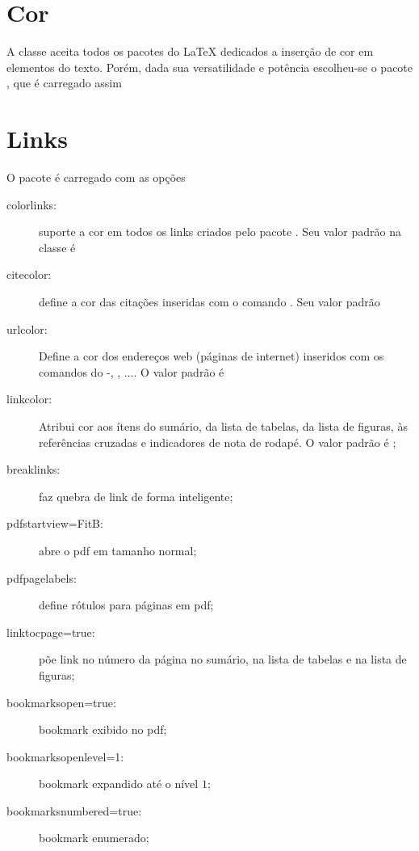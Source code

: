 \section{Cor}

A classe \estilo{} aceita todos os pacotes do \LaTeX{} dedicados a
inserção de cor em elementos do texto. Porém, dada sua versatilidade
e potência escolheu-se o pacote , que é carregado assim
\begin{center}
\end{center}

\section{Links} \label{links}
O pacote  é carregado com as opções
\begin{description}
  \item[colorlinks:] suporte a cor em todos os
     links criados pelo pacote . Seu valor padrão
     na classe \estilo{} é \hfill {}
  \item[citecolor:] define a cor das citações inseridas com o
     comando . Seu valor padrão
\hfill {}
  \item[urlcolor:] Define a cor dos endereços web (páginas de internet)
     inseridos com os comandos do  -,
     , $\ldots$. O valor padrão é \hfill {}
  \item[linkcolor:] Atribui cor aos ítens do sumário, da lista de
     tabelas, da lista de figuras, às referências cruzadas e indicadores
     de nota de rodapé. O valor padrão é \hfill  {};
  \item[breaklinks:] faz quebra de link de forma inteligente;
  \item[pdfstartview=FitB:] abre o pdf em tamanho normal;
  \item[pdfpagelabels:] define rótulos para páginas em pdf;
  \item[linktocpage=true:] põe link no número da página no sumário, na lista
     de tabelas e na lista de figuras;
  \item[bookmarksopen=true:] bookmark exibido no pdf;
  \item[bookmarksopenlevel=1:] bookmark expandido até o nível $1$;
  \item[bookmarksnumbered=true:] bookmark enumerado;
\end{description}

